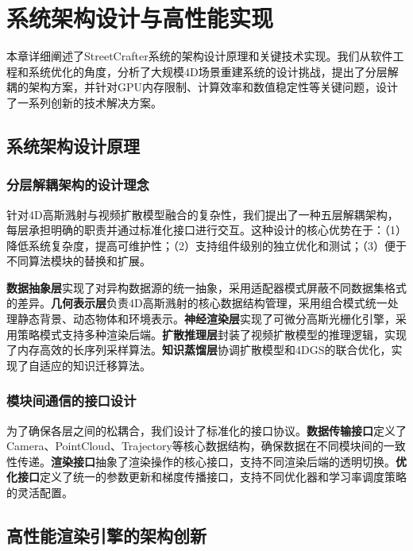 
\chapter{系统架构设计与高性能实现}

本章详细阐述了StreetCrafter系统的架构设计原理和关键技术实现。我们从软件工程和系统优化的角度，分析了大规模4D场景重建系统的设计挑战，提出了分层解耦的架构方案，并针对GPU内存限制、计算效率和数值稳定性等关键问题，设计了一系列创新的技术解决方案。

\section{系统架构设计原理}

\subsection{分层解耦架构的设计理念}

针对4D高斯溅射与视频扩散模型融合的复杂性，我们提出了一种五层解耦架构，每层承担明确的职责并通过标准化接口进行交互。这种设计的核心优势在于：（1）降低系统复杂度，提高可维护性；（2）支持组件级别的独立优化和测试；（3）便于不同算法模块的替换和扩展。

\textbf{数据抽象层}实现了对异构数据源的统一抽象，采用适配器模式屏蔽不同数据集格式的差异。\textbf{几何表示层}负责4D高斯溅射的核心数据结构管理，采用组合模式统一处理静态背景、动态物体和环境表示。\textbf{神经渲染层}实现了可微分高斯光栅化引擎，采用策略模式支持多种渲染后端。\textbf{扩散推理层}封装了视频扩散模型的推理逻辑，实现了内存高效的长序列采样算法。\textbf{知识蒸馏层}协调扩散模型和4DGS的联合优化，实现了自适应的知识迁移算法。

\subsection{模块间通信的接口设计}

为了确保各层之间的松耦合，我们设计了标准化的接口协议。\textbf{数据传输接口}定义了Camera、PointCloud、Trajectory等核心数据结构，确保数据在不同模块间的一致性传递。\textbf{渲染接口}抽象了渲染操作的核心接口，支持不同渲染后端的透明切换。\textbf{优化接口}定义了统一的参数更新和梯度传播接口，支持不同优化器和学习率调度策略的灵活配置。

\section{高性能渲染引擎的架构创新}


